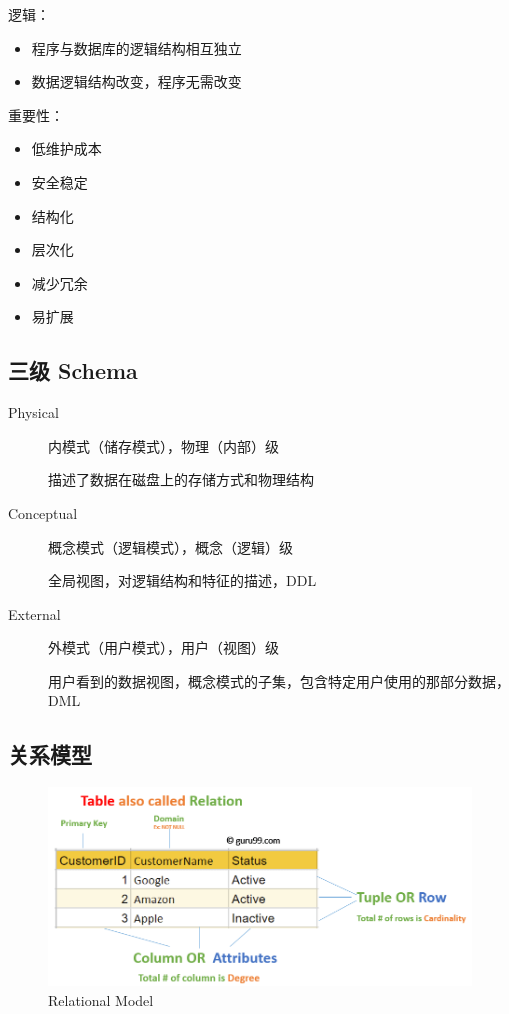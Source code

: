 \documentclass[11pt,journal,compsoc]{IEEEtran}
\begin{document}
逻辑：

\begin{itemize}
    \item 程序与数据库的逻辑结构相互独立

    \item 数据逻辑结构改变，程序无需改变
\end{itemize}

重要性：

\begin{itemize}
    \item 低维护成本

    \item 安全稳定

    \item 结构化

    \item 层次化

    \item 减少冗余

    \item 易扩展
\end{itemize}


\subsection{三级 Schema}

\begin{description}
    \item[Physical] 
    内模式（储存模式），物理（内部）级
    
    描述了数据在磁盘上的存储方式和物理结构

    \item[Conceptual]
    概念模式（逻辑模式），概念（逻辑）级
    
    全局视图，对逻辑结构和特征的描述，DDL

    \item[External]
    外模式（用户模式），用户（视图）级

    用户看到的数据视图，概念模式的子集，包含特定用户使用的那部分数据，DML
\end{description}


\subsection{关系模型}

\begin{figure}[H]
    \centering
    \includegraphics[width=\linewidth]{RelationalModel.jpg}
    \caption{Relational Model}
\end{figure}
\end{document}
